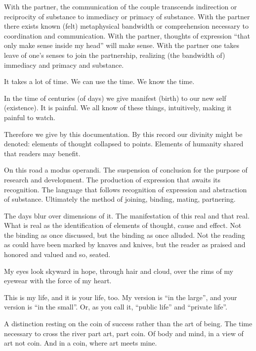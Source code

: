 \vfill
\break

﻿With the partner, the communication of the couple transcends
indirection or reciprocity of substance to immediacy or primacy of
substance.  With the partner there exists known (felt) metaphysical
bandwidth or comprehension necessary to coordination and
communication.  With the partner, thoughts of expression ``that only
make sense inside my head'' will make sense.  With the partner one
takes leave of one’s senses to join the partnership, realizing (the
bandwidth of) immediacy and primacy and substance.

\vfill
\break

﻿It takes a lot of time.  We can use the time.  We know the time.

In the time of centuries (of days) we give manifest (birth) to our new
self (existence).  It is painful.  We all know of these things,
intuitively, making it painful to watch.

Therefore we give by this documentation.  By this record our divinity
might be denoted: elements of thought collapsed to points.  Elements
of humanity shared that readers may benefit.

On this road a modus operandi.  The suspension of conclusion for the
purpose of research and development.  The production of expression
that awaits its recognition.  The language that follows recognition of
expression and abstraction of substance.  Ultimately the method of
joining, binding, mating, partnering.

The days blur over dimensions of it.  The manifestation of this real
and that real.  What is real as the identification of elements of
thought, cause and effect.  Not the binding as once discussed, but the
binding as once alluded.  Not the reading as could have been marked by
knaves and knives, but the reader as praised and honored and valued
and so, seated.

\vfill
\break

﻿My eyes look skyward in hope, through hair and cloud, over the rims of
my eyewear with the force of my heart.

This is my life, and it is your life, too.  My version is ``in the
large'', and your version is ``in the small''.  Or, as you call it,
``public life'' and ``private life''.

A distinction resting on the coin of success rather than the art of
being.  The time necessary to cross the river part art, part coin.  Of
body and mind, in a view of art not coin.  And in a coin, where art
meets mine.

